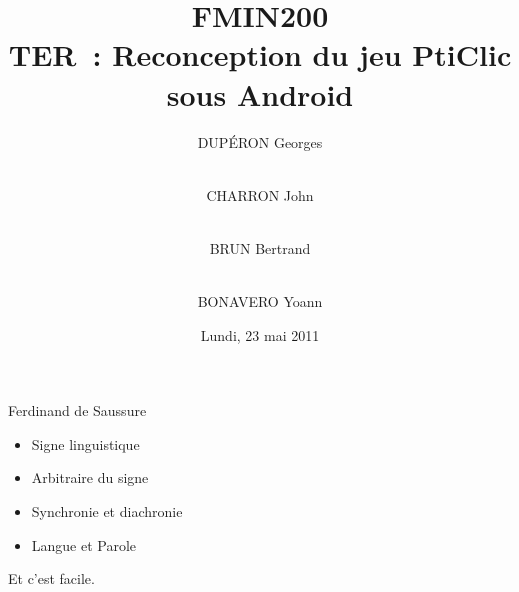 \documentclass{beamer}
\title{FMIN200 \\ TER~: Reconception du jeu PtiClic sous Android}
\author{DUPÉRON Georges \and\\ CHARRON John \and\\ BRUN Bertrand \and\\ BONAVERO Yoann}
\institute{Université Montpellier II, Département informatique}
\date{Lundi, 23 mai 2011}
\begin{document}
\begin{frame}
  \titlepage
\end{frame}

\begin{frame}
  
  Ferdinand de Saussure
  \begin{itemize}
  \item Signe linguistique
  \item Arbitraire du signe
  \item Synchronie et diachronie
  \item Langue et Parole
  \end{itemize}
  
  
\end{frame}

\begin{frame}
  Et c'est facile.
\end{frame}
\end{document}

